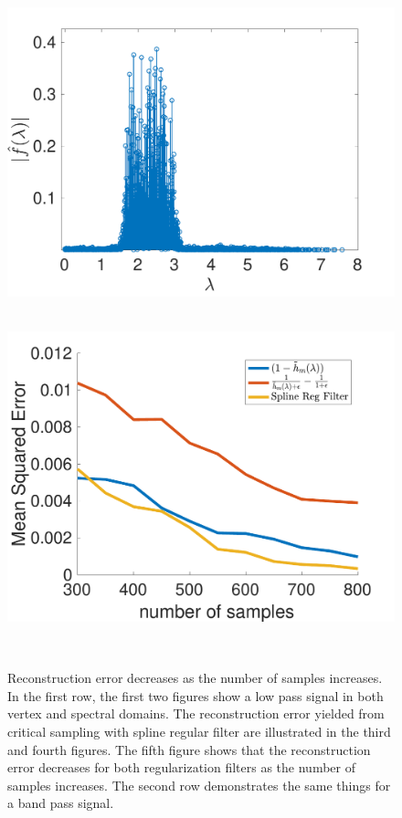 \documentclass[a4paper]{article}
\theoremstyle{definition}
\begin{document}
\begin{figure}[bth]
\begin{minipage}[m]{0.16\linewidth}
\end{minipage}
\begin{minipage}[m]{0.16\linewidth}
\centerline{~~\includegraphics[width=.85\linewidth]{fig_rational_filter_error_spectral_band_pass_bunny}}
\end{minipage}
\begin{minipage}[m]{0.16\linewidth}
\centerline{~~\includegraphics[width=.85\linewidth]{fig_samples_error_trade_off_band_pass}}
\end{minipage}\\

\caption{Reconstruction error decreases as the number of samples increases. In the first row, the first two figures show a low pass signal in both vertex and spectral domains. The reconstruction error yielded from critical sampling with spline regular filter are illustrated in the third and fourth figures. The fifth figure shows that the reconstruction error decreases for both regularization filters as the number of samples increases. The second row demonstrates the same things for a band pass signal.}
\end{figure}
\end{document}
